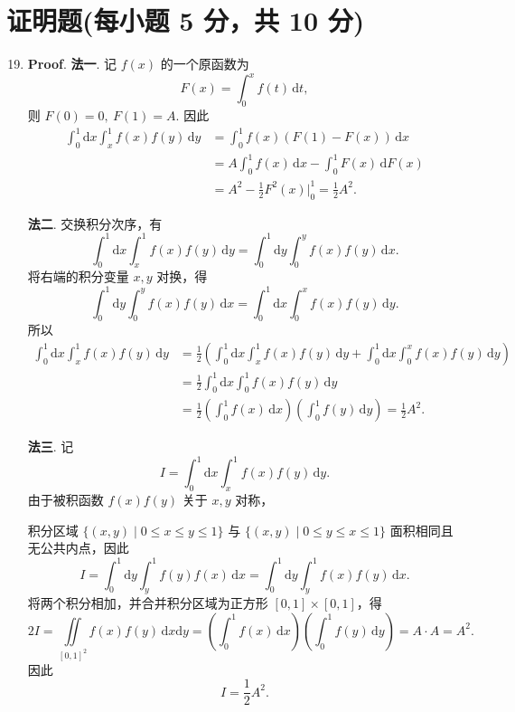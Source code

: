\documentclass[../Main.tex]{subfiles}
\begin{document}
\section{证明题(每小题 5 分，共 10 分)}
\begin{enumerate}
  \setcounter{enumi}{18}
  \item \textbf{Proof}. \textbf{法一}. 记 \(f(x)\) 的一个原函数为
        \[
          F(x)=\int_0^x f(t)\,\mathrm{d}t,
        \]
        则 \(F(0)=0,\ F(1)=A\). 因此
        \[
          \begin{aligned}
            \int_0^1\mathrm{d}x\int_x^1 f(x)f(y)\,\mathrm{d}y
             & =\int_0^1 f(x)\left(F(1)-F(x)\right)\,\mathrm{d}x          \\
             & =A\int_0^1 f(x)\,\mathrm{d}x-\int_0^1 F(x)\,\mathrm{d}F(x) \\
             & =A^2-\frac{1}{2}F^2(x)\bigg|_0^1
            =\frac{1}{2}A^2.
          \end{aligned}
        \]

        \textbf{法二}. 交换积分次序，有
        \[
          \int_0^1\mathrm{d}x\int_x^1 f(x)f(y)\,\mathrm{d}y
          =\int_0^1\mathrm{d}y\int_0^y f(x)f(y)\,\mathrm{d}x.
        \]
        将右端的积分变量 \(x,y\) 对换，得
        \[
          \int_0^1\mathrm{d}y\int_0^y f(x)f(y)\,\mathrm{d}x
          =\int_0^1\mathrm{d}x\int_0^x f(x)f(y)\,\mathrm{d}y.
        \]
        所以
        \[
          \begin{aligned}
            \int_0^1\mathrm{d}x\int_x^1 f(x)f(y)\,\mathrm{d}y
             & =\frac{1}{2}\left(\int_0^1\mathrm{d}x\int_x^1 f(x)f(y)\,\mathrm{d}y
            +\int_0^1\mathrm{d}x\int_0^x f(x)f(y)\,\mathrm{d}y\right)                                     \\
             & =\frac{1}{2}\int_0^1\mathrm{d}x\int_0^1 f(x)f(y)\,\mathrm{d}y                              \\
             & =\frac{1}{2}\left(\int_0^1 f(x)\,\mathrm{d}x\right)\left(\int_0^1 f(y)\,\mathrm{d}y\right)
            =\frac{1}{2}A^2.
          \end{aligned}
        \]

        \textbf{法三}. 记
        \[
          I = \int_0^1 \mathrm{d}x \int_x^1 f(x)f(y)\,\mathrm{d}y.
        \]
        由于被积函数 $f(x)f(y)$ 关于 $x,y$ 对称，

        积分区域 $\{(x,y)\mid 0\le x\le y\le 1\}$ 与 $\{(x,y)\mid 0\le y\le x\le 1\}$ 面积相同且无公共内点，因此
        \[
          I = \int_0^1 \mathrm{d}y \int_y^1 f(y)f(x)\,\mathrm{d}x = \int_0^1 \mathrm{d}y \int_y^1 f(x)f(y)\,\mathrm{d}x.
        \]
        将两个积分相加，并合并积分区域为正方形 $[0,1]\times[0,1]$，得
        \[
          2I = \iint\limits_{[0,1]^2} f(x)f(y)\,\mathrm{d}x\mathrm{d}y
          = \left(\int_0^1 f(x)\,\mathrm{d}x\right)\left(\int_0^1 f(y)\,\mathrm{d}y\right)
          = A \cdot A = A^2.
        \]
        因此
        \[
          I = \frac{1}{2}A^2.
        \]


\end{enumerate}
\end{document}
